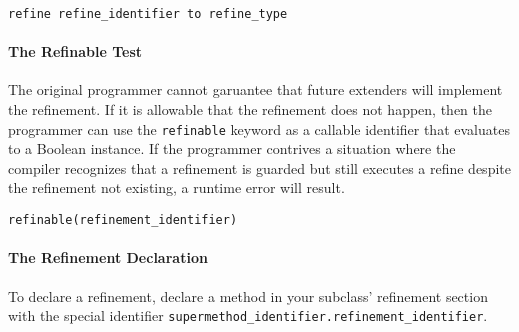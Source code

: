 \begin{lstlisting}
refine refine_identifier to refine_type
\end{lstlisting}

\paragraph{The Refinable Test}
The original programmer cannot garuantee that future extenders will implement the refinement. If it is allowable that the refinement does not happen, then the programmer can use the \verb!refinable! keyword as a callable identifier that evaluates to a Boolean instance. If the programmer contrives a situation where the compiler recognizes that a refinement is guarded but still executes a refine despite the refinement not existing, a runtime error will result.

\begin{lstlisting}
refinable(refinement_identifier)
\end{lstlisting}

\paragraph{The Refinement Declaration}
To declare a refinement, declare a method in your subclass' refinement section with the special identifier \verb!supermethod_identifier.refinement_identifier!.
